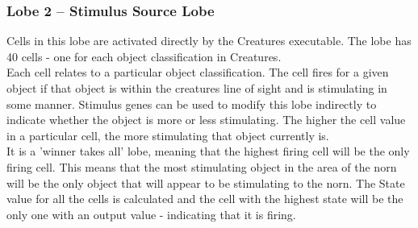 \documentclass[11pt,twoside,a4paper]{article}
\begin{document}
\subsubsection{Lobe 2 -- Stimulus Source Lobe}

Cells in this lobe are activated directly by the Creatures executable. The lobe has 40 cells - one for each object classification in Creatures.~\\

Each cell relates to a particular object classification. The cell fires for a given object if that object is within the creatures line of sight and is stimulating in some manner. Stimulus genes can be used to modify this lobe indirectly to indicate whether the object is more or less stimulating. The higher the cell value in a particular cell, the more stimulating that object currently is.~\\

It is a 'winner takes all' lobe, meaning that the highest firing cell will be the only firing cell. This means that the most stimulating object in the area of the norn will be the only object that will appear to be stimulating to the norn. The State value for all the cells is calculated and the cell with the highest state will be the only one with an output value - indicating that it is firing.~\\


\end{document}
